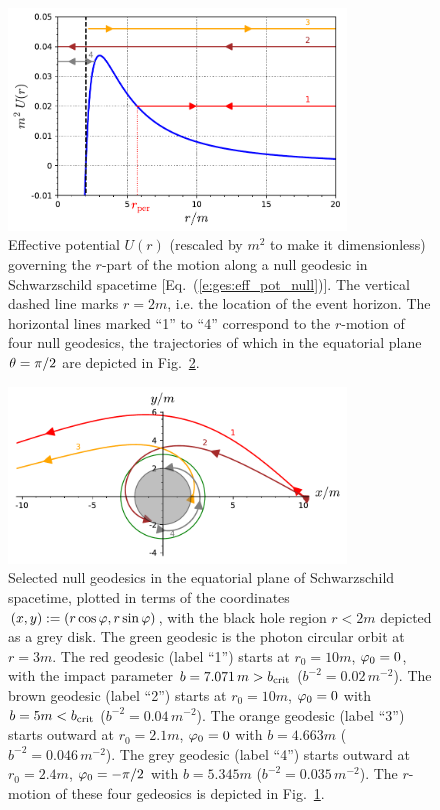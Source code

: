 \begin{figure}
\centerline{\includegraphics[width=0.8\textwidth]{ges_eff_pot_null.pdf}}
\caption[]{\label{f:ges:eff_pot_null} \footnotesize
Effective potential $U(r)$ (rescaled by $m^2$ to make it dimensionless)
governing the $r$-part of the
motion along a null geodesic in
Schwarzschild spacetime [Eq.~(\ref{e:ges:eff_pot_null})].
The vertical dashed line marks $r=2m$, i.e. the
location of the event horizon. The horizontal lines marked ``1'' to ``4''
correspond to the $r$-motion of four null geodesics,
the trajectories of which in the equatorial plane $\theta=\pi/2$
are depicted in Fig.~\ref{f:ges:null_geod}.}
\end{figure}

\begin{figure}
\centerline{\includegraphics[width=0.8\textwidth]{ges_null_geod.pdf}}
\caption[]{\label{f:ges:null_geod} \footnotesize
Selected null geodesics in the equatorial plane of Schwarzschild spacetime,
plotted in terms
of the coordinates $(x,y) := (r\cos\varphi, r\sin\varphi)$, with the black hole
region $r<2m$ depicted as a grey disk.
The green geodesic is the photon circular orbit at $r=3m$.
The red geodesic (label ``1'') starts at $r_0=10 m$, $\varphi_0=0$, with
the impact parameter $b = 7.071 \, m > b_{\rm crit}$ ($b^{-2} = 0.02\, m^{-2}$).
The brown geodesic (label ``2'') starts at $r_0=10 m$, $\varphi_0=0$ with $b = 5 m < b_{\rm crit}$ ($b^{-2} = 0.04\, m^{-2}$).
The orange geodesic (label ``3'') starts outward at $r_0=2.1 m$, $\varphi_0=0$ with $b = 4.663 m$ ($b^{-2} = 0.046\, m^{-2}$).
The grey geodesic (label ``4'') starts outward at $r_0=2.4 m$, $\varphi_0=-\pi/2$ with $b = 5.345 m$ ($b^{-2} = 0.035\, m^{-2}$).
The $r$-motion of these four gedeosics is depicted in
Fig.~\ref{f:ges:eff_pot_null}.}
\end{figure}

